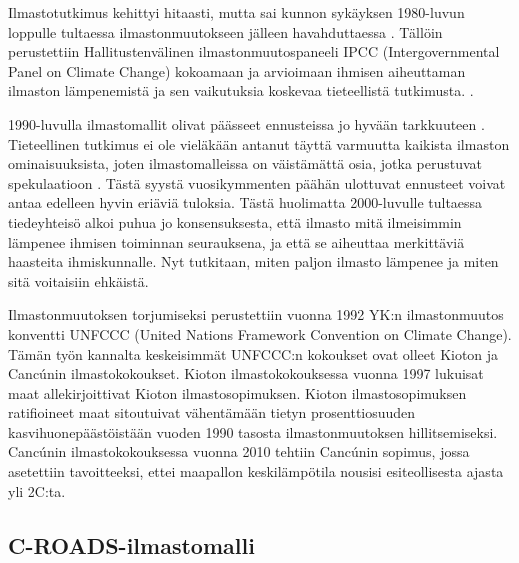 \documentclass[finnish,12pt,a4paper,pdftex]{article}
\begin{document}
\begin{onehalfspacing}
Ilmastotutkimus kehittyi hitaasti, mutta sai kunnon sykäyksen 1980-luvun loppulle tultaessa ilmastonmuutokseen jälleen havahduttaessa  \cite{AmericanInstituteofPhysics}. Tällöin perustettiin Hallitustenvälinen ilmastonmuutospaneeli IPCC (Intergovernmental Panel on Climate Change) kokoamaan ja arvioimaan ihmisen aiheuttaman ilmaston lämpenemistä ja sen vaikutuksia koskevaa tieteellistä tutkimusta. \cite{IPCChistory}. 

1990-luvulla ilmastomallit olivat päässeet ennusteissa jo hyvään tarkkuuteen \cite{AmericanInstituteofPhysics}. Tieteellinen tutkimus ei ole vieläkään antanut täyttä varmuutta kaikista ilmaston ominaisuuksista, joten ilmastomalleissa on väistämättä osia, jotka perustuvat spekulaatioon \cite{CroadsFlightSimulator2011}. Tästä syystä vuosikymmenten päähän ulottuvat ennusteet voivat antaa edelleen hyvin eriäviä tuloksia. Tästä huolimatta 2000-luvulle tultaessa tiedeyhteisö alkoi puhua jo konsensuksesta, että ilmasto mitä ilmeisimmin lämpenee ihmisen toiminnan seurauksena, ja että se aiheuttaa merkittäviä haasteita ihmiskunnalle. Nyt tutkitaan, miten paljon ilmasto lämpenee ja miten sitä voitaisiin ehkäistä. \cite{AmericanInstituteofPhysics}

Ilmastonmuutoksen torjumiseksi perustettiin vuonna 1992 YK:n ilmastonmuutos konventti UNFCCC (United Nations Framework Convention on Climate Change). Tämän työn kannalta keskeisimmät UNFCCC:n kokoukset ovat olleet Kioton ja Cancúnin ilmastokokoukset. Kioton ilmastokokouksessa vuonna 1997 lukuisat maat allekirjoittivat Kioton ilmastosopimuksen. Kioton ilmastosopimuksen ratifioineet maat sitoutuivat vähentämään tietyn prosenttiosuuden kasvihuonepäästöistään vuoden 1990 tasosta ilmastonmuutoksen hillitsemiseksi. Cancúnin ilmastokokouksessa vuonna 2010 tehtiin Cancúnin sopimus, jossa asetettiin tavoitteeksi, ettei maapallon keskilämpötila nousisi esiteollisesta ajasta yli 2\degree C:ta. \cite{UNFCCC} 

\subsection{C-ROADS-ilmastomalli \label{ilmasto:croads}}


\end{onehalfspacing}
\end{document}
